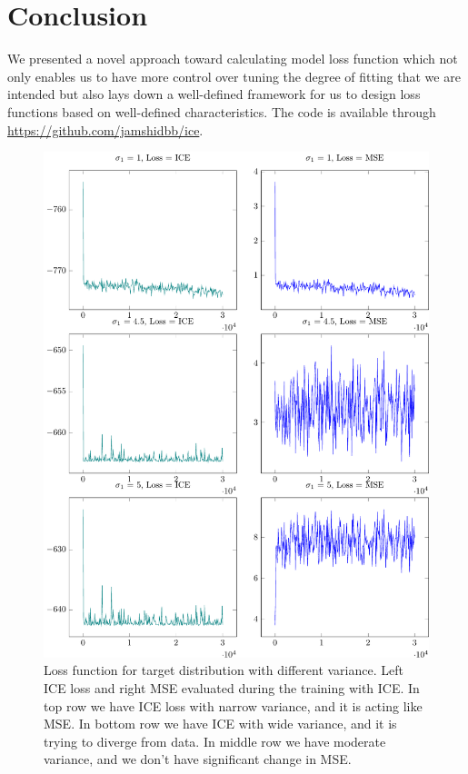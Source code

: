 \documentclass[conference]{IEEEtran}
\begin{document}
\section{Conclusion}
We presented a novel approach toward calculating model loss function which not only enables us to
have more control over tuning the degree of fitting that we are intended but also lays down 
a well-defined framework for us to design loss functions based on well-defined characteristics.
The code is available through \href{https://github.com/jamshidbb/ice}{https://github.com/jamshidbb/ice}.

\begin{figure}
    \center
    \includegraphics[width=0.70\linewidth]{./fig/losses/out/losses.pdf}
    \caption{
        Loss function for target distribution with different variance.
        Left ICE loss and right MSE evaluated during the training with ICE. In top row we have
        ICE loss with narrow variance, and it is acting like MSE. In bottom row we have ICE
        with wide variance, and it is trying to diverge from data. In middle row we  have 
        moderate variance, and we don't have significant change in MSE.
    }
    \label{fig:loss}
\end{figure}
\end{document}
